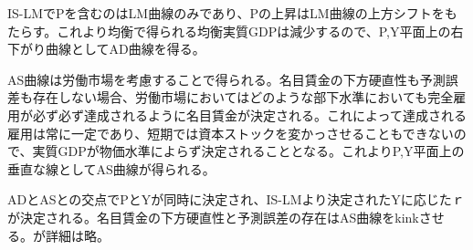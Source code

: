 \documentclass{jsarticle}
\begin{document}
IS-LMでPを含むのはLM曲線のみであり、Pの上昇はLM曲線の上方シフトをもたらす。これより均衡で得られる均衡実質GDPは減少するので、P,Y平面上の右下がり曲線としてAD曲線を得る。

AS曲線は労働市場を考慮することで得られる。名目賃金の下方硬直性も予測誤差も存在しない場合、労働市場においてはどのような部下水準においても完全雇用が必ず必ず達成されるように名目賃金が決定される。これによって達成される雇用は常に一定であり、短期では資本ストックを変かっさせることもできないので、実質GDPが物価水準によらず決定されることとなる。これよりP,Y平面上の垂直な線としてAS曲線が得られる。

ADとASとの交点でPとYが同時に決定され、IS-LMより決定されたYに応じたｒが決定される。名目賃金の下方硬直性と予測誤差の存在はAS曲線をkinkさせる。が詳細は略。
\end{document}
